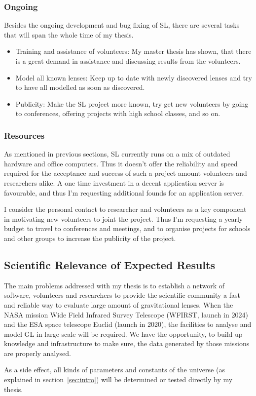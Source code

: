 \documentclass[11pt]{article}
\begin{document}
\subsubsection{Ongoing}
\label{sec:ongoing}

Besides the ongoing development and bug fixing of SL, there are several tasks that will span the whole time of my thesis.

\begin{itemize}
  \item Training and assistance of volunteers: My master thesis has shown, that there is a great demand in assistance and discussing results from the volunteers.
  \item Model all known lenses: Keep up to date with newly discovered lenses and try to have all modelled as soon as discovered.
  \item Publicity: Make the SL project more known, try get new volunteers by going to conferences, offering projects with high school classes, and so on.
\end{itemize}


\subsubsection{Resources}

As mentioned in previous sections, SL currently runs on a mix of outdated hardware and office computers.
Thus it doesn't offer the reliability and speed required for the acceptance and success of such a project amount volunteers and researchers alike.
A one time investment in a decent application server is favourable, and thus I'm requesting additional founds for an application server.

I consider the personal contact to researcher and volunteers as a key component in motivating new volunteers to joint the project.
Thus I'm requesting a yearly budget to travel to conferences and meetings, and to organise projects for schools and other groups to increase the publicity of the project.



\subsection{Scientific Relevance of Expected Results}

The main problems addressed with my thesis is to establish a network of software, volunteers and researchers to provide the scientific community a fast and reliable way to evaluate large amount of gravitational lenses.
When the NASA mission Wide Field Infrared Survey Telescope (WFIRST, launch in 2024) and the ESA space telescope Euclid (launch in 2020), the facilities to analyse and model GL in large scale will be required.
We have the opportunity, to build up knowledge and infrastructure to make sure, the data generated by those missions are properly analysed.

As a side effect, all kinds of parameters and constants of the universe (as explained in section~\ref{sec:intro}) will be determined or tested directly by my thesis.





\end{document}
